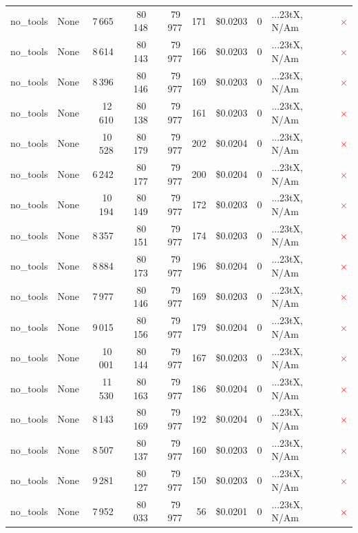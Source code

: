 \documentclass[a4paper,11pt]{article}
\begin{document}
\begin{table}[H]
{\begin{tabular}{l r r r r r r r l c}
no\_tools & None & 7\,665 & 80\,148 & 79\,977 & 171 & \$0.0203 & 0 & ...23tX, N/Am & \textcolor{red}{\(\times\)} \\
no\_tools & None & 8\,614 & 80\,143 & 79\,977 & 166 & \$0.0203 & 0 & ...23tX, N/Am & \textcolor{red}{\(\times\)} \\
no\_tools & None & 8\,396 & 80\,146 & 79\,977 & 169 & \$0.0203 & 0 & ...23tX, N/Am & \textcolor{red}{\(\times\)} \\
no\_tools & None & 12\,610 & 80\,138 & 79\,977 & 161 & \$0.0203 & 0 & ...23tX, N/Am & \textcolor{red}{\(\times\)} \\
no\_tools & None & 10\,528 & 80\,179 & 79\,977 & 202 & \$0.0204 & 0 & ...23tX, N/Am & \textcolor{red}{\(\times\)} \\
no\_tools & None & 6\,242 & 80\,177 & 79\,977 & 200 & \$0.0204 & 0 & ...23tX, N/Am & \textcolor{red}{\(\times\)} \\
no\_tools & None & 10\,194 & 80\,149 & 79\,977 & 172 & \$0.0203 & 0 & ...23tX, N/Am & \textcolor{red}{\(\times\)} \\
no\_tools & None & 8\,357 & 80\,151 & 79\,977 & 174 & \$0.0203 & 0 & ...23tX, N/Am & \textcolor{red}{\(\times\)} \\
no\_tools & None & 8\,884 & 80\,173 & 79\,977 & 196 & \$0.0204 & 0 & ...23tX, N/Am & \textcolor{red}{\(\times\)} \\
no\_tools & None & 7\,977 & 80\,146 & 79\,977 & 169 & \$0.0203 & 0 & ...23tX, N/Am & \textcolor{red}{\(\times\)} \\
no\_tools & None & 9\,015 & 80\,156 & 79\,977 & 179 & \$0.0204 & 0 & ...23tX, N/Am & \textcolor{red}{\(\times\)} \\
no\_tools & None & 10\,001 & 80\,144 & 79\,977 & 167 & \$0.0203 & 0 & ...23tX, N/Am & \textcolor{red}{\(\times\)} \\
no\_tools & None & 11\,530 & 80\,163 & 79\,977 & 186 & \$0.0204 & 0 & ...23tX, N/Am & \textcolor{red}{\(\times\)} \\
no\_tools & None & 8\,143 & 80\,169 & 79\,977 & 192 & \$0.0204 & 0 & ...23tX, N/Am & \textcolor{red}{\(\times\)} \\
no\_tools & None & 8\,507 & 80\,137 & 79\,977 & 160 & \$0.0203 & 0 & ...23tX, N/Am & \textcolor{red}{\(\times\)} \\
no\_tools & None & 9\,281 & 80\,127 & 79\,977 & 150 & \$0.0203 & 0 & ...23tX, N/Am & \textcolor{red}{\(\times\)} \\
no\_tools & None & 7\,952 & 80\,033 & 79\,977 & 56 & \$0.0201 & 0 & ...23tX, N/Am & \textcolor{red}{\(\times\)} \\

\end{tabular}}
\end{table}
\end{document}
